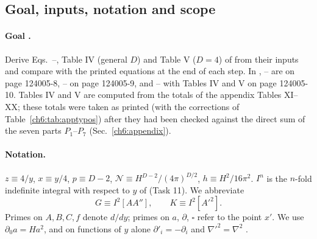 \subsection{Goal, inputs, notation and scope}

\paragraph{Goal \tP.} Derive Eqs.~--, Table IV (general $D$) and Table V ($D=4$) of \PI{} from their inputs and compare
with the printed equations at the end of each step. In \PI, -- are on page 124005-8, -- on page 124005-9, and
-- with Tables IV and V on page 124005-10. Tables IV and V are computed from the totals of the appendix Tables XI--XX; these
totals were taken as printed (with the corrections of Table~\ref{ch6:tab:apptypos}) after they had been checked against the direct sum of the
seven parts $P_1$--$P_7$ (Sec.~\ref{ch6:appendix}).

\paragraph{Notation.} $z\equiv4/y$, $x\equiv y/4$, $p\equiv D-2$, $\mathcal N\equiv H^{D-2}/(4\pi)^{D/2}$, $h\equiv H^2/16\pi^2$.
$I^n$ is the $n$-fold indefinite integral with respect to $y$ of  (Task 11). We abbreviate
\begin{equation}
G\equiv I^2[AA''],\qquad K\equiv I^2[A'^2].
\end{equation}
Primes on $A,B,C,f$ denote $d/dy$; primes on $a$, $\partial$, $\square$ refer to the point $x'$. We use $\partial_0a=Ha^2$, and on functions
of $y$ alone $\partial'_i=-\partial_i$ and $\nabla'^2=\nabla^2$ .

